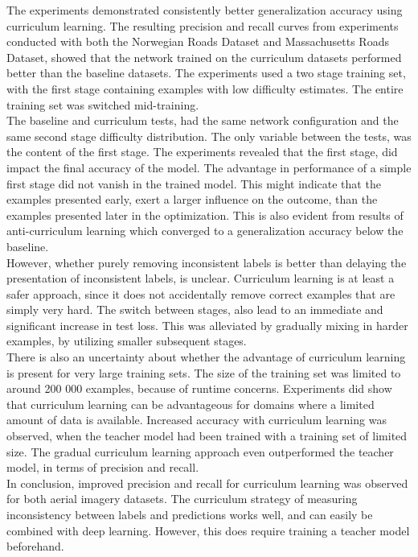 The experiments demonstrated consistently better generalization accuracy using curriculum learning. The resulting precision and recall curves from experiments conducted with both the Norwegian Roads Dataset and Massachusetts Roads Dataset, showed that the network trained on the curriculum datasets performed better than the baseline datasets. The experiments used a two stage training set, with the first stage containing examples with low difficulty estimates. The entire training set was switched mid-training. \\

The baseline and curriculum tests, had the same network configuration and the same second stage difficulty distribution. The only variable between the tests, was the content of the first stage. The experiments revealed that the first stage, did impact the final accuracy of the model. The advantage in performance of a simple first stage did not vanish in the trained model. This might indicate that the examples presented early, exert a larger influence on the outcome, than the examples presented later in the optimization. This is also evident from results of anti-curriculum learning which converged to a generalization accuracy below the baseline. \\

However, whether purely removing inconsistent labels is better than delaying the presentation of inconsistent labels, is unclear. Curriculum learning is at least a safer approach, since it does not accidentally remove correct examples that are simply very hard. The switch between stages, also lead to an immediate and significant increase in test loss. This was alleviated by gradually mixing in harder examples, by utilizing smaller subsequent stages.\\

There is also an uncertainty about whether the advantage of curriculum learning is present for very large training sets. The size of the training set was limited to around 200 000 examples, because of runtime concerns. Experiments did show that curriculum learning can be advantageous for domains where a limited amount of data is available. Increased accuracy with curriculum learning was observed, when the teacher model had been trained with a training set of limited size. The gradual curriculum learning approach even outperformed the teacher model, in terms of precision and recall.\\

In conclusion, improved precision and recall for curriculum learning was observed for both aerial imagery datasets. The curriculum strategy of measuring inconsistency between labels and predictions works well, and can easily be combined with deep learning. However, this does require training a teacher model beforehand.



